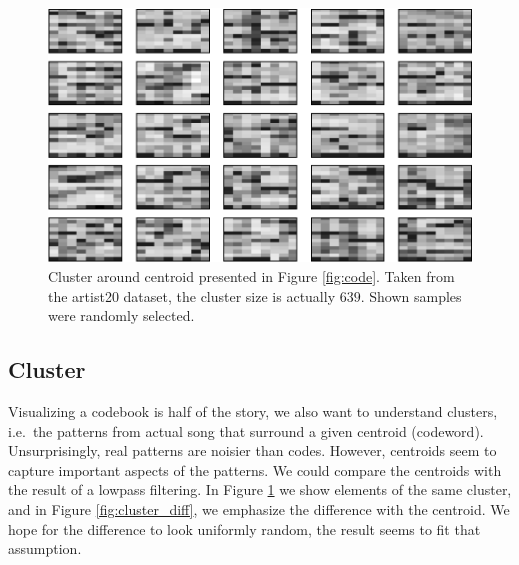\documentclass{article}
\newcommand{\ie}{i.e.~}
\begin{document}
\begin{figure}[htb]
\begin{center}
\includegraphics[width=.9\columnwidth]{close_patterns1}
\end{center}
\caption{\small{Cluster around centroid presented in
Figure \ref{fig:code}. Taken from the artist20 dataset, the cluster
size is actually $639$. Shown samples were randomly selected.
}}
\label{fig:cluster}
\end{figure}

\subsection{Cluster}
Visualizing a codebook is half of the story, we also want to understand
clusters, \ie the patterns from actual song that
surround a given centroid (codeword). Unsurprisingly, real patterns are
noisier than codes. However, centroids seem to capture important aspects
of the patterns. We could compare the centroids with the result of
a lowpass filtering. In Figure \ref{fig:cluster} we show elements of the same
cluster, and in Figure \ref{fig:cluster_diff}, we emphasize the difference
with the centroid. We hope for the difference to look uniformly random,
the result seems to fit that assumption.

\end{document}
